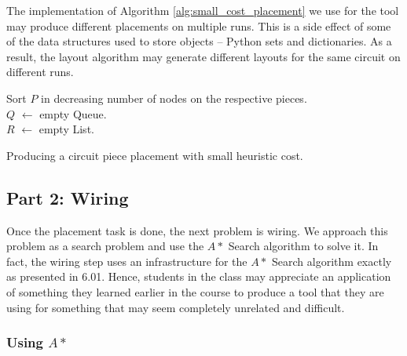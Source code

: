 The implementation of Algorithm \ref{alg:small_cost_placement} we use for the
tool may produce different placements on multiple runs. This is a side
effect of some of the data structures used to store objects -- Python sets and
dictionaries. As a result, the layout algorithm may generate different layouts
for the same circuit on different runs.

\begin{algorithm}
\BlankLine
Sort $P$ in decreasing number of nodes on the respective pieces.\\
$Q$ $\leftarrow$ empty Queue.\\
$R$ $\leftarrow$ empty List.\\
\caption{Producing a circuit piece placement with small heuristic cost.}
\label{alg:small_cost_placement}
\end{algorithm}

\subsection{Part 2: Wiring}

Once the placement task is done, the next problem is wiring.
We approach this problem as a search problem and use the $A*$ Search algorithm to
solve it. In fact, the wiring step uses an infrastructure for the $A*$ Search
algorithm exactly as presented in 6.01. Hence, students in
the class may appreciate an application of something they learned
earlier in the course to produce a tool that they are using for something that
may seem completely unrelated and difficult.

\subsubsection{Using $A*$}

